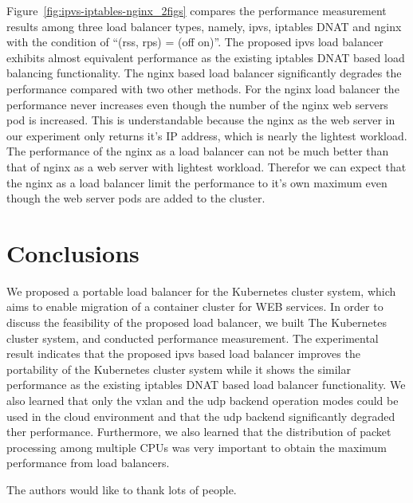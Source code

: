 Figure~\ref{fig:ipvs-iptables-nginx_2figs} compares the performance measurement results 
among three load balancer types, namely, ipvs, iptables DNAT and nginx 
with the condition of \enquote{(rss, rps) = (off on)}.
The proposed ipvs load balancer exhibits almost equivalent performance as the existing iptables 
DNAT based load balancing functionality. 
The nginx based load balancer significantly degrades the performance compared with two other methods.
For the nginx load balancer the performance never increases even though the number of the 
nginx web servers pod is increased.
This is understandable because the nginx as the web server in our experiment only 
returns it's IP address, which is nearly the lightest workload.
The performance of the nginx as a load balancer can not be much better than that of nginx as a web server 
with lightest workload.
Therefor we can expect that the nginx as a load balancer limit the performance to it's own maximum 
even though the web server pods are added to the cluster.

\section{Conclusions}\label{Conclusions}

We proposed a portable load balancer for the Kubernetes cluster system, 
which aims to enable migration of a container cluster for WEB services.
In order to discuss the feasibility of the proposed load balancer, we built 
The Kubernetes cluster system, and conducted performance measurement.
The experimental result indicates that the proposed ipvs based load balancer improves the portability of 
the Kubernetes cluster system while it shows the similar performance as the existing iptables DNAT based load balancer functionality.
We also learned that only the vxlan and the udp backend operation modes could be used 
in the cloud environment and that the udp backend significantly degraded ther performance.
Furthermore, we also learned that the distribution of packet processing among multiple CPUs was very important
to obtain the maximum performance from load balancers.



\begin{acks}
  The authors would like to thank lots of people.

\end{acks}
